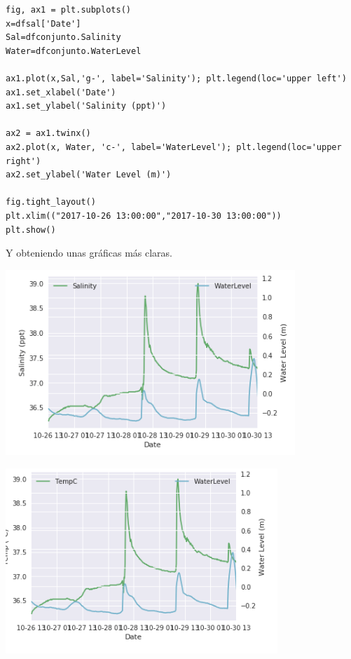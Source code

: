 \documentclass{article}
\begin{document}
\begin{verbatim}
fig, ax1 = plt.subplots()
x=dfsal['Date']
Sal=dfconjunto.Salinity
Water=dfconjunto.WaterLevel

ax1.plot(x,Sal,'g-', label='Salinity'); plt.legend(loc='upper left')
ax1.set_xlabel('Date')
ax1.set_ylabel('Salinity (ppt)')

ax2 = ax1.twinx()
ax2.plot(x, Water, 'c-', label='WaterLevel'); plt.legend(loc='upper right')
ax2.set_ylabel('Water Level (m)')

fig.tight_layout()
plt.xlim(("2017-10-26 13:00:00","2017-10-30 13:00:00"))
plt.show()
\end{verbatim}

Y obteniendo unas gráficas más claras.

	\begin{center}
    \includegraphics[height=7cm]{ejey1.png}
    \end{center}
	
    \begin{center}
    \includegraphics[height=7cm]{ejey2.png}
    \end{center}
	
\end{document}

